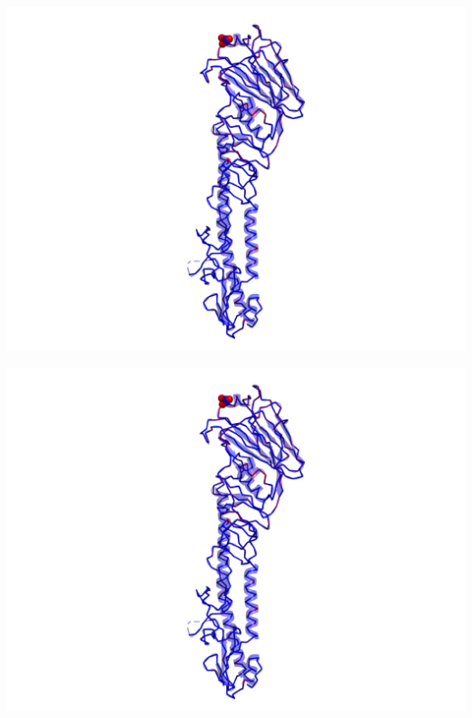 \documentclass[12pt]{article}
\newenvironment{Figure}
  {\par\medskip\noindent\minipage{\linewidth}}
  {\endminipage\par\medskip}
\begin{document}
\begin{multicols}{2}
\begin{Figure}
\end{Figure}
\begin{Figure}
 \centering
 \includegraphics[width=\linewidth]{subsample_2_viewA.png}
\end{Figure}
\begin{Figure}
 \centering
 \includegraphics[width=\linewidth]{subsample_3_viewA.png}
\end{Figure}
\begin{Figure}
 \centering

\end{Figure}
\end{multicols}
\end{document}
